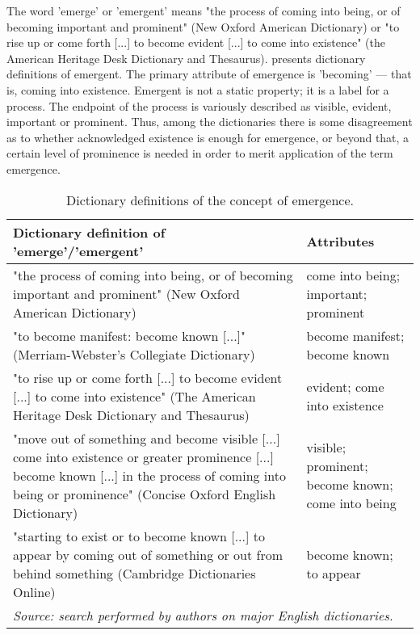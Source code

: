 \documentclass[11pt]{article}
\begin{document}
The word 'emerge' or 'emergent' means "the process of coming into being, or of becoming important and prominent" (New Oxford American Dictionary) or "to rise up or come forth [...] to become evident [...] to come into existence" (the American Heritage Desk Dictionary and Thesaurus).  presents dictionary definitions of emergent. The primary attribute of emergence is 'becoming' --- that is, coming into existence.  Emergent is not a static property; it is a label for a process.  The endpoint of the process is variously described as visible, evident, important or prominent.  Thus, among the dictionaries there is some disagreement as to whether acknowledged existence is enough for emergence, or beyond that, a certain level of prominence is needed in order to merit application of the term emergence.

\setlength{\tabcolsep}{10pt}
\renewcommand{\arraystretch}{1.5}
\begin{table}\footnotesize
	\caption{\label{tab:dictionary}Dictionary definitions of the concept of emergence.}
	\centering
{\begin{tabular}{p{10cm}p{5cm}}
\hline\hline
\textbf{Dictionary definition of 'emerge'/'emergent'}& \textbf{Attributes}\\
\hline
"the process of coming into being, or of becoming important and prominent" (New Oxford American Dictionary) & come into being; important; prominent\\ 

"to become manifest: become known [...]" (Merriam-Webster's Collegiate Dictionary) & become manifest; become known\\
     
"to rise up or come forth [...] to become evident [...] to come into existence" (The American Heritage Desk Dictionary and Thesaurus) & evident; come into existence\\
          
"move out of something and become visible [...] come into existence or greater prominence [...] become known [...] in the process of coming into being or prominence" (Concise Oxford English Dictionary) & visible; prominent; become known; come into being\\

"starting to exist or to become known [...] to appear by coming out of something or out from behind something (Cambridge Dictionaries Online) & become known; to appear\\

\hline\hline
\multicolumn{2}{l}{\footnotesize \textit{Source: search performed by authors on major English dictionaries.}}
\end{tabular}
}
\end{table}
\end{document}
